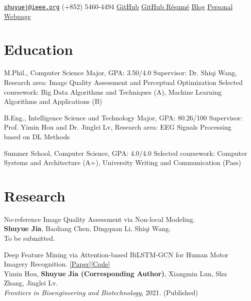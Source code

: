 \documentclass{my_cv}
\begin{document}
\hspace*{\fill}


\hspace*{\fill}

\longcontact
{\href{mailto:shuyuej@ieee.org}{\nolinkurl{shuyuej@ieee.org}}}
{(+852) 5460-4494}
{\href{https://github.com/SuperBruceJia}{GitHub}}
{\href{https://resume.github.io/?SuperBruceJia}{GitHub R\'esum\'e}}
{\href{http://shuyuej.com/blog}{Blog}}
{\href{https://shuyuej.com/}{Personal Webpage}}

\hspace*{\fill}

\section{Education}
\workitemsthree
{M.Phil., Computer Science Major, GPA: 3.50/4.0}
{Supervisor: Dr. Shiqi Wang, Research area: Image Quality Assessment and Perceptual Optimization}
{Selected coursework: Big Data Algorithms and Techniques (A), Machine Learning Algorithms and Applications (B)}

\workitemstwo
{B.Eng., Intelligence Science and Technology Major, GPA: 80.26/100}
{Supervisor: Prof. Yimin Hou and Dr. Jinglei Lv, Research area: EEG Signals Processing based on DL Methods}

\workitemstwo
{Summer School, Computer Science, GPA: 4.0/4.0}
{Selected coursework: Computer Systems and Architecture (A+), University Writing and Communication (Pass)}

\hspace*{\fill}

\section{Research}

\workitemsone
{No-reference Image Quality Assessment via Non-local Modeling. \\
	\textbf{Shuyue Jia}, Baoliang Chen, Dingquan Li, Shiqi Wang. \\
	To be submitted.
}

\hspace*{\fill}

\workitemsone
{Deep Feature Mining via Attention-based BiLSTM-GCN for Human Motor Imagery Recognition. \href{https://www.frontiersin.org/articles/10.3389/fbioe.2021.706229/abstract}{[Paper]}\href{https://github.com/SuperBruceJia/EEG-DL}{[Code]}\\
	Yimin Hou, \textbf{Shuyue Jia (Corresponding Author)}, Xiangmin Lun, Shu Zhang, Jinglei Lv. \\
	\emph{Frontiers in Bioengineering and Biotechnology}, 2021. (Published)
}
\end{document}

